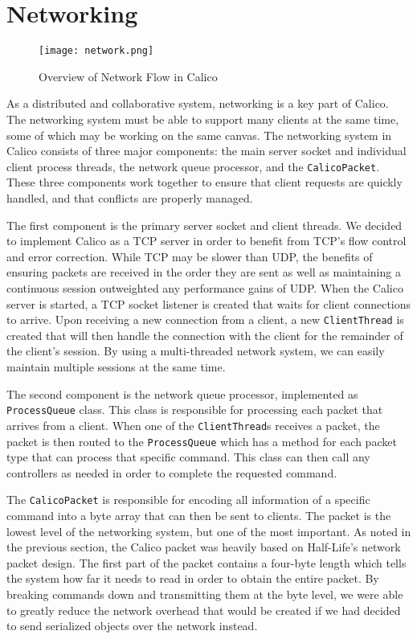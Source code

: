 \section{Networking}

\begin{figure}[htb]
  \centering
  \texttt{[image: network.png]}
  \caption{Overview of Network Flow in Calico}
  \label{fig:network}
\end{figure}
As a distributed and collaborative system, networking is a key part of Calico. The networking system must be able to support many clients at the same time, some of which may be working on the same canvas. The networking system in Calico consists of three major components: the main server socket and individual client process threads, the network queue processor, and the \texttt{CalicoPacket}. These three components work together to ensure that client requests are quickly handled, and that conflicts are properly managed.

The first component is the primary server socket and client threads. We decided to implement Calico as a TCP \cite{network} server in order to benefit from TCP's flow control and error correction. While TCP may be slower than UDP, the benefits of ensuring packets are received in the order they are sent as well as maintaining a continuous session outweighted any performance gains of UDP. When the Calico server is started, a TCP socket listener is created that waits for client connections to arrive. Upon receiving a new connection from a client, a new \texttt{ClientThread} is created that will then handle the connection with the client for the remainder of the client's session. By using a multi-threaded network system, we can easily maintain multiple sessions at the same time.

The second component is the network queue processor, implemented as \texttt{ProcessQueue} class. This class is responsible for processing each packet that arrives from a client. When one of the \texttt{ClientThread}s receives a packet, the packet is then routed to the \texttt{ProcessQueue} which has a method for each packet type that can process that specific command. This class can then call any controllers as needed in order to complete the requested command.

The \texttt{CalicoPacket} is responsible for encoding all information of a specific command into a byte array that can then be sent to clients. The packet is the lowest level of the networking system, but one of the most important. As noted in the previous section, the Calico packet was heavily based on Half-Life's network packet design. The first part of the packet contains a four-byte length which tells the system how far it needs to read in order to obtain the entire packet. By breaking commands down and transmitting them at the byte level, we were able to greatly reduce the network overhead that would be created if we had decided to send serialized objects over the network instead.

